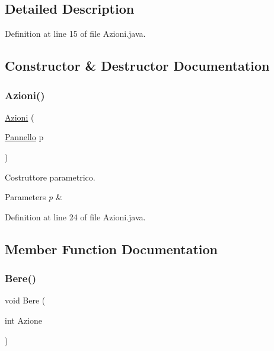 \subsection{Detailed Description}


Definition at line 15 of file Azioni.\+java.



\subsection{Constructor \& Destructor Documentation}
\mbox{\label{classa_1_1survival_1_1game_1_1_azioni_af521149b5bbecac98d09d33772e4bfd2}} 
\subsubsection{\texorpdfstring{Azioni()}{Azioni()}}
{\footnotesize\ttfamily \hyperlink{classa_1_1survival_1_1game_1_1_azioni}{Azioni} (\begin{DoxyParamCaption}\item[{\hyperlink{classa_1_1survival_1_1game_1_1_pannello}{Pannello}}]{p }\end{DoxyParamCaption})}



Costruttore parametrico. 


\begin{DoxyParams}{Parameters}
{\em p} & \\
\hline
\end{DoxyParams}


Definition at line 24 of file Azioni.\+java.



\subsection{Member Function Documentation}
\mbox{\label{classa_1_1survival_1_1game_1_1_azioni_af6157da89a39a95e583e0bffc2da471d}} 
\subsubsection{\texorpdfstring{Bere()}{Bere()}}
{\footnotesize\ttfamily void Bere (\begin{DoxyParamCaption}\item[{int}]{Azione }\end{DoxyParamCaption})}



